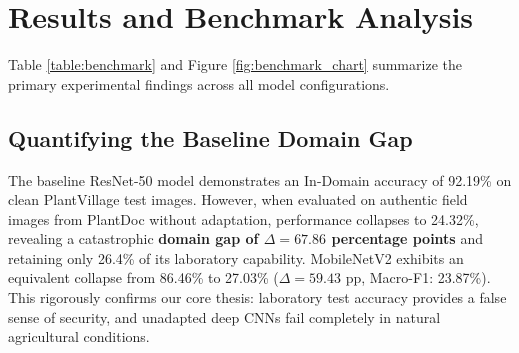 \documentclass[twoside,a4paper,11pt]{article}
\begin{document}
\section{Results and Benchmark Analysis}

Table \ref{table:benchmark} and Figure \ref{fig:benchmark_chart} summarize the primary experimental findings across all model configurations.

\subsection{Quantifying the Baseline Domain Gap}
The baseline ResNet-50 model \cite{He:16} demonstrates an In-Domain accuracy of 92.19\% on clean PlantVillage test images. However, when evaluated on authentic field images from PlantDoc without adaptation, performance collapses to 24.32\%, revealing a catastrophic \textbf{domain gap of $\Delta = 67.86$ percentage points} and retaining only 26.4\% of its laboratory capability. MobileNetV2 exhibits an equivalent collapse from 86.46\% to 27.03\% ($\Delta = 59.43$ pp, Macro-F1: 23.87\%). This rigorously confirms our core thesis: laboratory test accuracy provides a false sense of security, and unadapted deep CNNs fail completely in natural agricultural conditions.
\end{document}
